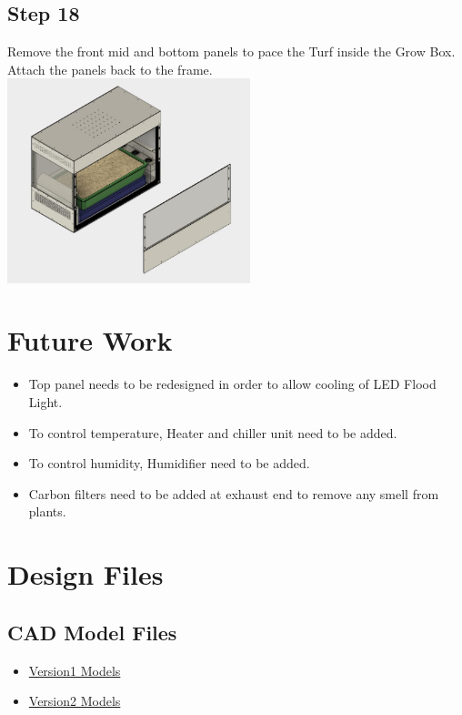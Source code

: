 \documentclass[a4paper,12pt,oneside]{book}
\begin{document}
\subsection*{Step 18}
Remove the front mid and bottom panels to pace the Turf inside the Grow Box. Attach the panels back to the frame.\\
\includegraphics[width=200pt]{18}



\section{Future Work}
\begin{itemize}
\item Top panel needs to be redesigned in order to allow cooling of LED Flood Light.
\item To control temperature, Heater and chiller unit need to be added.
\item To control humidity, Humidifier need to be added.
\item Carbon filters need to be added at exhaust end to remove any smell from plants.
\end{itemize}

\section {Design Files}
\subsection{CAD Model Files}
\begin{itemize}
    \item \href{https://drive.google.com/file/d/0B8nJz0e_p6YNYkN4LWZJdHdqNEE/view?usp=sharing}{Version1 Models}
    \item \href{https://drive.google.com/open?id=0B8nJz0e_p6YNaC00T0h0N1Y0VVE}{Version2 Models}
\end{itemize}
\end{document}
